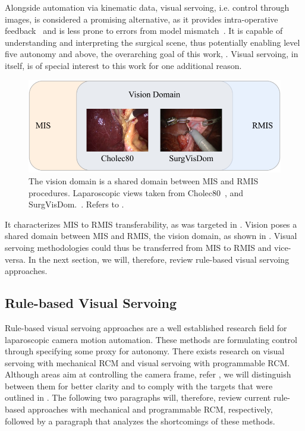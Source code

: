 
Alongside automation via kinematic data, visual servoing, i.e. control through images, is considered a promising alternative, as it provides intra-operative feedback~\cite{pandya2014review} and is less prone to errors from model mismatch~\cite{azizian2014visual}. It is capable of understanding and interpreting the surgical scene, thus potentially enabling level five autonomy and above, the overarching goal of this work, . Visual servoing, in itself, is of special interest to this work for one additional reason.
\begin{figure}[htb]
    \centering
    \includegraphics{introduction/fig/shared_domain.pdf}
    \caption{The vision domain is a shared domain between MIS and RMIS procedures. Laparoscopic views taken from Cholec80~\cite{twinanda2016endonet}, and SurgVisDom.~\cite{zia2021surgical}. Refers to .}
    \label{in:fig:shared_domain}
\end{figure}
It characterizes MIS to RMIS transferability, as was targeted in . Vision poses a shared domain between MIS and RMIS, the vision domain, as shown in . Visual servoing methodologies could thus be transferred from MIS to RMIS and vice-versa. In the next section, we will, therefore, review rule-based visual servoing approaches.

\subsection{Rule-based Visual Servoing}
\label{in:sec:rule_based_approaches}
Rule-based visual servoing approaches are a well established research field for laparoscopic camera motion automation. These methods are formulating control through specifying some proxy for autonomy. There exists research on visual servoing with mechanical RCM and visual servoing with programmable RCM. Although areas aim at controlling the camera frame, refer , we will distinguish between them for better clarity and to comply with the targets that were outlined in . The following two paragraphs will, therefore, review current rule-based approaches with mechanical and programmable RCM, respectively, followed by a paragraph that analyzes the shortcomings of these methods.


